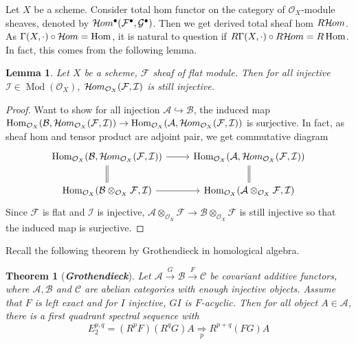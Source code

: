 \documentclass{ctexart}
\newtheorem{theorem}{Theorem}[section]
\newtheorem{lemma}{Lemma}[section]
\renewcommand{\hom}{\operatorname{Hom}}
\newcommand{\sheafhom}{\mathcal{H}\kern -.5pt om}
\newcommand{\module}{\operatorname{Mod}}
\begin{document}
Let $X$ be a scheme.
Consider total hom functor on the category of $\mathcal{O}_{X}$-module sheaves, 
denoted by $\sheafhom^{\bullet}(\mathcal{F}^{\bullet}, \mathcal{G}^{\bullet})$.
Then we get derived total sheaf hom $R\sheafhom$.
As $\Gamma(X, \cdot) \circ \sheafhom = \hom$, it is natural to question if $R\Gamma(X, \cdot) \circ R\sheafhom = R\hom$.
In fact, this comes from the following lemma.
\begin{lemma}
    Let $X$ be a scheme, $\mathcal{F}$ sheaf of flat module.
    Then for all injective $\mathcal{I}\in \module(\mathcal{O}_{X})$, $\sheafhom_{\mathcal{O}_{X}}(\mathcal{F}, \mathcal{I})$ is still injective.
    \label{Lemma 7.7}
\end{lemma}
\begin{proof}
    Want to show for all injection $\mathcal{A} \hookrightarrow \mathcal{B}$,
    the induced map $\hom_{\mathcal{O}_{X}}(\mathcal{B}, \sheafhom_{\mathcal{O}_{X}}(\mathcal{F}, \mathcal{I})) \rightarrow \hom_{\mathcal{O}_{X}}(\mathcal{A}, \sheafhom_{\mathcal{O}_{X}}(\mathcal{F}, \mathcal{I}))$ is surjective.
    In fact, as sheaf hom and tensor product are adjoint pair, we get commutative diagram
    \begin{equation}
        \begin{tikzcd}
            \hom_{\mathcal{O}_{X}}(\mathcal{B}, \sheafhom_{\mathcal{O}_{X}}(\mathcal{F}, \mathcal{I})) \arrow[r] \arrow[d, equal] &
            \hom_{\mathcal{O}_{X}}(\mathcal{A}, \sheafhom_{\mathcal{O}_{X}}(\mathcal{F}, \mathcal{I})) \arrow[d, equal] \\
            \hom_{\mathcal{O}_{X}}(\mathcal{B} \otimes_{\mathcal{O}_{X}} \mathcal{F}, \mathcal{I}) \arrow[r] &
            \hom_{\mathcal{O}_{X}}(\mathcal{A} \otimes_{\mathcal{O}_{X}} \mathcal{F}, \mathcal{I})
        \end{tikzcd}
    \end{equation}
    Since $\mathcal{F}$ is flat and $\mathcal{I}$ is injective, 
    $\mathcal{A} \otimes_{\mathcal{O}_{X}} \mathcal{F} \rightarrow \mathcal{B} \otimes_{\mathcal{O}_{X}} \mathcal{F}$ is still injective so that the induced map is surjective.
\end{proof}
Recall the following theorem by Grothendieck in homological algebra.
\begin{theorem}[\textbf{\emph{Grothendieck}}]
    Let $\mathscr{A} \overset{G}{\rightarrow} \mathscr{B} \overset{F}{\rightarrow} \mathscr{C}$ be covariant additive functors,
    where $\mathscr{A}, \mathscr{B}$ and $\mathscr{C}$ are abelian categories with enough injective objects.
    Assume that $F$ is left exact and for $I$ injective, $GI$ is $F$-acyclic.
    Then for all object $A\in \mathscr{A}$, there is a first quadrant spectral sequence with
    \begin{equation}
        E_{2}^{p, q} = (R^{p}F)(R^{q}G)A \underset{p}{\Rightarrow} R^{p + q}(FG)A
    \end{equation}
    \vspace{-1.5\baselineskip} %
    \label{Theorem 7.1}
\end{theorem}
\end{document}
